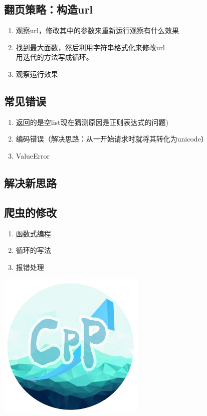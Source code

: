 \documentclass{beamer}
\begin{document}
\subsection{翻页策略：构造url}
\begin{frame}
\begin{enumerate}
  \item 观察url，修改其中的参数来重新运行观察有什么效果
  \item 找到最大面数，然后利用字符串格式化来修改url\\用迭代的方法写成循环。
  \item 观察运行效果
\end{enumerate}
\end{frame}

\subsection{常见错误}
\begin{frame}
\begin{enumerate}
  \item 返回的是空list现在猜测原因是正则表达式的问题)
  \item 编码错误（解决思路：从一开始请求时就将其转化为unicode）
  \item{ValueError}
\end{enumerate}
\end{frame}

\subsection{解决新思路}
\begin{frame}
\end{frame}

\subsection{爬虫的修改}
\begin{frame}
\begin{enumerate}
  \item{函数式编程}
  \item{循环的写法}
  \item{报错处理}
\end{enumerate}
\end{frame}



\begin{frame}
\begin{center}
  \includegraphics[width=7cm,height=7cm]{CPP.jpg}
\end{center}
\end{frame}
\end{document}
